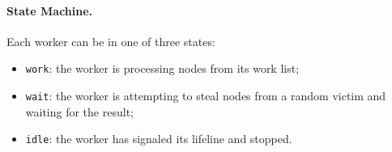 \paragraph{State Machine.} Each worker can be in one of three states:
\begin{itemize}
\item \lstinline{work}: the worker is processing nodes from its work list;
\item \lstinline{wait}: the worker is attempting to steal nodes from a random victim and waiting for the result;
\item \lstinline{idle}: the worker has signaled its lifeline and stopped.
\end{itemize}

